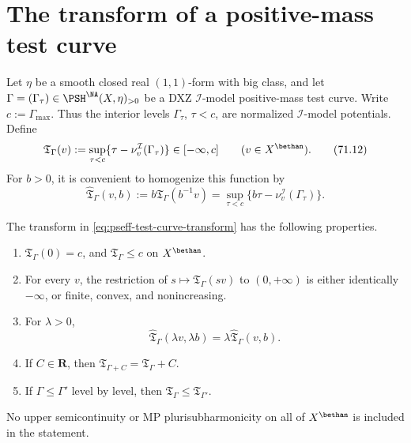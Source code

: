 \section{The transform of a positive-mass test curve}
\label{sec:pseff-one-curve}

Let $\eta$ be a smooth closed real $(1,1)$-form with big class, and
let
$\Gamma=(\Gamma_\tau)\in\PSH^{\NA}(X,\eta)_{>0}$ be a DXZ
$\mathcal I$-model positive-mass test curve.  Write
$c:=\Gamma_{\max}$.  Thus the interior levels
$\Gamma_\tau$, $\tau<c$, are normalized
$\mathcal I$-model potentials.  Define
\[
 \mathfrak T_\Gamma(v)
 :=\sup_{\tau<c}
       \{\tau-\nu_v^{\mathcal I}(\Gamma_\tau)\}
 \in[-\infty,c]
 \qquad (v\in X^{\bethan}).
\tag{71.12}\label{eq:pseff-test-curve-transform}
\]
For $b>0$, it is convenient to homogenize this function by
\[
 \widehat{\mathfrak T}_\Gamma(v,b)
 :=b\mathfrak T_\Gamma(b^{-1}v)
 =\sup_{\tau<c}
       \{b\tau-\nu_v^{\mathcal I}(\Gamma_\tau)\}.
\tag{71.13}\label{eq:pseff-homogeneous-transform}
\]

\begin{proposition}\label{prop:pseff-one-curve-transform}
The transform in \eqref{eq:pseff-test-curve-transform} has the following
properties.
\begin{enumerate}
\item \(\mathfrak T_\Gamma(0)=c\), and
      \(\mathfrak T_\Gamma\leq c\) on \(X^{\bethan}\).
\item For every \(v\), the restriction of
      \(s\mapsto\mathfrak T_\Gamma(sv)\) to \((0,+\infty)\) is either
      identically \(-\infty\), or finite, convex, and nonincreasing.
\item For \(\lambda>0\),
      \[
       \widehat{\mathfrak T}_\Gamma(\lambda v,\lambda b)
       =\lambda\widehat{\mathfrak T}_\Gamma(v,b).
      \tag{71.14}\label{eq:pseff-joint-homogeneity}
      \]
\item If \(C\in\mathbf R\), then
      \(\mathfrak T_{\Gamma+C}=\mathfrak T_\Gamma+C\).
\item If \(\Gamma\leq\Gamma'\) level by level, then
      \(\mathfrak T_\Gamma\leq\mathfrak T_{\Gamma'}\).
\end{enumerate}
No upper semicontinuity or MP plurisubharmonicity on all of
\(X^{\bethan}\) is included in the statement.
\end{proposition}

